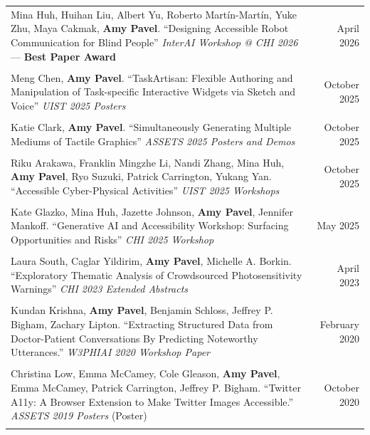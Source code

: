 \begin{longtable}{Xr}
	Mina Huh, Huihan Liu, Albert Yu, Roberto Martín-Martín, Yuke Zhu, Maya Cakmak, \textbf{Amy Pavel}. ``Designing Accessible Robot Communication for Blind People'' \textit{InterAI Workshop @ CHI 2026} --- \textbf{Best Paper Award} & April 2026 \\
	\\

	Meng Chen, \textbf{Amy Pavel}. ``TaskArtisan: Flexible Authoring and Manipulation of Task-specific Interactive Widgets via Sketch and Voice'' \textit{UIST 2025 Posters} & October 2025 \\
	\\

	Katie Clark, \textbf{Amy Pavel}. ``Simultaneously Generating Multiple Mediums of Tactile Graphics'' \textit{ASSETS 2025 Posters and Demos} & October 2025 \\
	\\

	Riku Arakawa, Franklin Mingzhe Li, Nandi Zhang, Mina Huh, \textbf{Amy Pavel}, Ryo Suzuki, Patrick Carrington, Yukang Yan. ``Accessible Cyber-Physical Activities'' \textit{UIST 2025 Workshops} & October 2025 \\
	\\

	Kate Glazko, Mina Huh, Jazette Johnson, \textbf{Amy Pavel}, Jennifer Mankoff. ``Generative AI and Accessibility Workshop: Surfacing Opportunities and Risks'' \textit{CHI 2025 Workshop} & May 2025 \\
	\\

	Laura South, Caglar Yildirim, \textbf{Amy Pavel}, Michelle A. Borkin. ``Exploratory Thematic Analysis of Crowdsourced Photosensitivity Warnings'' \textit{CHI 2023 Extended Abstracts} & April 2023 \\
	\\

	Kundan Krishna, \textbf{Amy Pavel}, Benjamin Schloss, Jeffrey P. Bigham, Zachary Lipton. ``Extracting Structured Data from Doctor-Patient Conversations By Predicting Noteworthy Utterances.'' \textit{W3PHIAI 2020 Workshop Paper} & February 2020 \\
	\\

	Christina Low, Emma McCamey, Cole Gleason, \textbf{Amy Pavel}, Emma McCamey, Patrick Carrington, Jeffrey P. Bigham. ``Twitter A11y: A Browser Extension to Make Twitter Images Accessible.'' \textit{ASSETS 2019 Posters} (Poster) & October 2020 \\
	\\


\end{longtable}
